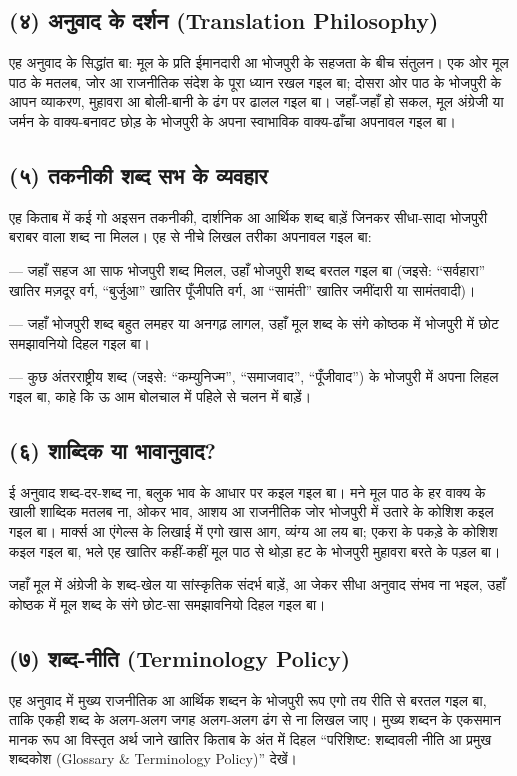 \documentclass[12pt,a4paper,oneside]{book}
\begin{document}
\subsection*{(४) अनुवाद के दर्शन {\engfont (Translation Philosophy)}}
एह अनुवाद के सिद्धांत बा: मूल के प्रति ईमानदारी आ भोजपुरी के सहजता के बीच संतुलन। एक ओर मूल पाठ के मतलब, जोर आ राजनीतिक संदेश के पूरा ध्यान रखल गइल बा; दोसरा ओर पाठ के भोजपुरी के आपन व्याकरण, मुहावरा आ बोली-बानी के ढंग पर ढालल गइल बा। जहाँ-जहाँ हो सकल, मूल अंग्रेजी या जर्मन के वाक्य-बनावट छोड़ के भोजपुरी के अपना स्वाभाविक वाक्य-ढाँचा अपनावल गइल बा।


\subsection*{(५) तकनीकी शब्द सभ के व्यवहार}
एह किताब में कई गो अइसन तकनीकी, दार्शनिक आ आर्थिक शब्द बाड़ें जिनकर सीधा-सादा भोजपुरी बराबर वाला शब्द ना मिलल। एह से नीचे लिखल तरीका अपनावल गइल बा:

— जहाँ सहज आ साफ भोजपुरी शब्द मिलल, उहाँ भोजपुरी शब्द बरतल गइल बा (जइसे: “सर्वहारा” खातिर मज़दूर वर्ग, “बुर्जुआ” खातिर पूँजीपति वर्ग, आ “सामंती” खातिर जमींदारी या सामंतवादी)।

— जहाँ भोजपुरी शब्द बहुत लमहर या अनगढ़ लागल, उहाँ मूल शब्द के संगे कोष्ठक में भोजपुरी में छोट समझावनियो दिहल गइल बा।

— कुछ अंतरराष्ट्रीय शब्द (जइसे: “कम्युनिज्म”, “समाजवाद”, “पूँजीवाद”) के भोजपुरी में अपना लिहल गइल बा, काहे कि ऊ आम बोलचाल में पहिले से चलन में बाड़ें।


\subsection*{(६) शाब्दिक या भावानुवाद?}
ई अनुवाद शब्द-दर-शब्द ना, बलुक भाव के आधार पर कइल गइल बा। मने मूल पाठ के हर वाक्य के खाली शाब्दिक मतलब ना, ओकर भाव, आशय आ राजनीतिक जोर भोजपुरी में उतारे के कोशिश कइल गइल बा। मार्क्स आ एंगेल्स के लिखाई में एगो खास आग, व्यंग्य आ लय बा; एकरा के पकड़े के कोशिश कइल गइल बा, भले एह खातिर कहीं-कहीं मूल पाठ से थोड़ा हट के भोजपुरी मुहावरा बरते के पड़ल बा।

जहाँ मूल में अंग्रेजी के शब्द-खेल या सांस्कृतिक संदर्भ बाड़ें, आ जेकर सीधा अनुवाद संभव ना भइल, उहाँ कोष्ठक में मूल शब्द के संगे छोट-सा समझावनियो दिहल गइल बा।


\subsection*{(७) शब्द-नीति {\engfont (Terminology Policy)}}
एह अनुवाद में मुख्य राजनीतिक आ आर्थिक शब्दन के भोजपुरी रूप एगो तय रीति से बरतल गइल बा, ताकि एकही शब्द के अलग-अलग जगह अलग-अलग ढंग से ना लिखल जाए। मुख्य शब्दन के एकसमान मानक रूप आ विस्तृत अर्थ जाने खातिर किताब के अंत में दिहल “परिशिष्ट: शब्दावली नीति आ प्रमुख शब्दकोश {\engfont (Glossary \& Terminology Policy)}” देखें।
\end{document}
